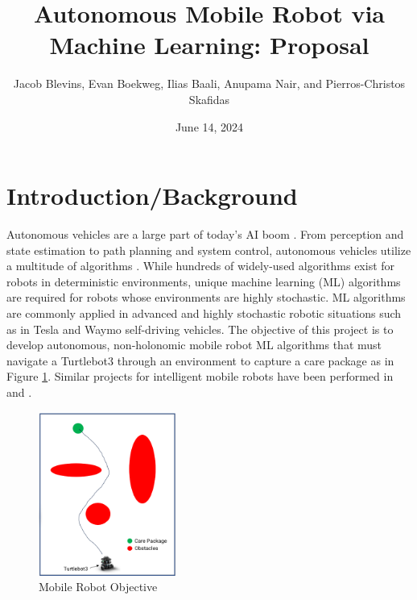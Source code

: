 \documentclass{article}
\title{Autonomous Mobile Robot via Machine Learning: Proposal}
\author{Jacob Blevins, Evan Boekweg, Ilias Baali, Anupama Nair, and Pierros-Christos Skafidas}
\date{June 14, 2024}
\begin{document}
\maketitle

\section{Introduction/Background} \label{sec:intro}
Autonomous vehicles are a large part of today's AI boom \cite{hottopic}. From perception and state estimation to path planning and system control, autonomous vehicles utilize a multitude of algorithms \cite{autonomous_review}. While hundreds of widely-used algorithms exist for robots in deterministic environments, unique machine learning (ML) algorithms are required for robots whose environments are highly stochastic. ML algorithms are commonly applied in advanced and highly stochastic robotic situations such as in Tesla \cite{tesla} and Waymo \cite{waymo} self-driving vehicles. The objective of this project is to develop autonomous, non-holonomic mobile robot ML algorithms that must navigate a Turtlebot3 through an environment to capture a care package as in Figure \ref{fig:proj_obj}. Similar projects for intelligent mobile robots have been performed in \cite{autocontrol} and \cite{mobilecontrol}.
\begin{figure}[htp]
    \centering
    \includegraphics[width=0.4\textwidth]{figs/objective_fig.png} %
    \caption{Mobile Robot Objective}
    \label{fig:proj_obj}
\end{figure}
\end{document}
